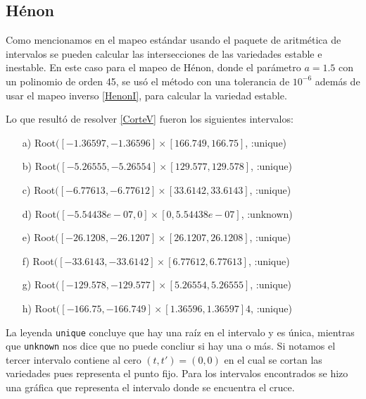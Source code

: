 \subsection{Hénon}
Como mencionamos en el mapeo estándar usando el paquete de aritmética de intervalos se pueden calcular las intersecciones de las variedades estable e inestable. En este caso para el mapeo de Hénon, donde el parámetro $a=1.5$ con un polinomio de orden 45, se usó el método con una tolerancia de $10^{-6}$ además de usar el mapeo inverso \ref{HenonI}, para calcular la variedad estable. 
 
Lo que resultó de resolver \ref{CorteV} fueron los siguientes intervalos:
\begin{itemize}
\item[a)] Root$([-1.36597, -1.36596] \times [166.749, 166.75]$, :unique)
\item[b)] Root$([-5.26555, -5.26554] \times [129.577, 129.578]$, :unique)
\item[c)] Root$([-6.77613, -6.77612] \times [33.6142, 33.6143]$, :unique)
\item[d)] Root$([-5.54438e-07, 0] \times [0, 5.54438e-07]$, :unknown)     
\item[e)] Root$([-26.1208, -26.1207] \times [26.1207, 26.1208]$, :unique)  
\item[f)] Root$([-33.6143, -33.6142] \times [6.77612, 6.77613]$, :unique)  
\item[g)] Root$([-129.578, -129.577] \times [5.26554, 5.26555]$, :unique) 
\item[h)] Root$([-166.75, -166.749] \times [1.36596, 1.36597]4$, :unique)
\end{itemize}

La leyenda \texttt{unique} concluye que hay una raíz en el intervalo y es única, mientras que \texttt{unknown} nos dice que no puede concliur si hay una o más. Si notamos el tercer intervalo contiene al cero $(t,t')=(0,0)$ en el cual se cortan las variedades pues representa el punto fijo. Para los intervalos encontrados se hizo una gráfica que representa el intervalo donde se encuentra el cruce. 


